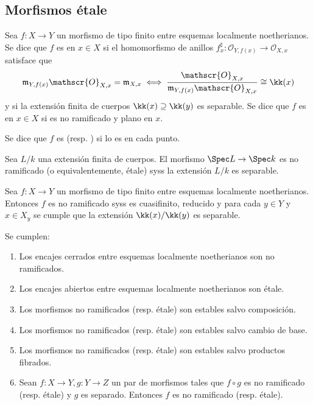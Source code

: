 \subsection{Morfismos étale}
\begin{mydef}
	Sea $f \colon X \to Y$ un morfismo de tipo finito entre esquemas localmente noetherianos.
	Se dice que $f$ es  en $x\in X$
	si el homomorfismo de anillos $f^\sharp_x \colon \mathscr{O}_{Y, f(x)} \to \mathscr{O}_{X, x}$ satisface que
	$$ \mathfrak{m}_{Y, f(x)} \mathscr{O}_{X, x} = \mathfrak{m}_{X, x} \iff \frac{\mathscr{O}_{X, x}}{\mathfrak{m}_{Y, f(x)} \mathscr{O}_{X, x}} \cong \kk(x) $$
	y si la extensión finita de cuerpos $\kk(x) \supseteq \kk(y)$ es separable.
	Se dice que $f$ es  en $x \in X$ si es no ramificado y plano en $x$.

	Se dice que $f$ es  (resp. ) si lo es en cada punto.
\end{mydef}
\begin{ex}
	Sea $L/k$ una extensión finita de cuerpos.
	El morfismo $\Spec L \to \Spec k$ es no ramificado (o equivalentemente, étale) syss la extensión $L/k$ es separable.
\end{ex}

\begin{lem}
	Sea $f \colon X \to Y$ un morfismo de tipo finito entre esquemas localmente noetherianos.
	Entonces $f$ es no ramificado syss es cuasifinito, reducido y para cada $y \in Y$ y $x \in X_y$ se cumple que la extensión $\kk(x) / \kk(y)$ es separable.
\end{lem}
\begin{prop}\label{thm:unram_et_prop}
	Se cumplen:
	\begin{enumerate}
		\item Los encajes cerrados entre esquemas localmente noetherianos son no ramificados.
		\item Los encajes abiertos entre esquemas localmente noetherianos son étale.
		\item Los morfismos no ramificados (resp. étale) son estables salvo composición.
		\item Los morfismos no ramificados (resp. étale) son estables salvo cambio de base.
		\item Los morfismos no ramificados (resp. étale) son estables salvo productos fibrados.
		\item Sean $f \colon X \to Y, g \colon Y \to Z$ un par de morfismos tales que $f\circ g$ es no ramificado (resp. étale)
			y $g$ es separado. Entonces $f$ es no ramificado (resp. étale).
	\end{enumerate}
\end{prop}

